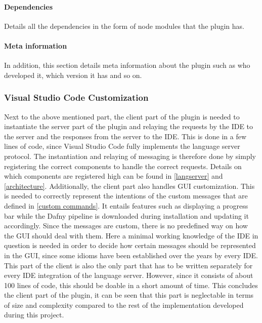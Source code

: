 \paragraph{Dependencies}
Details all the dependencies in the form of node modules that the plugin has.

\paragraph{Meta information}
In addition, this section details meta information about the plugin such as who developed it, which version it has and so on.

\subsubsection{Visual Studio Code Customization}
Next to the above mentioned part, the client part of the plugin is needed to instantiate the server part of the plugin and relaying the requests by the IDE to the server and the responses from the server to the IDE. This is done in a few lines of code, since Visual Studio Code fully implements the language server protocol. The instantiation and relaying of messaging is therefore done by simply registering the correct components to handle the correct requests. Details on which components are registered high can be found in \ref{langserver} and \ref{architecture}.\newline
Additionally, the client part also handles GUI customization. This is needed to correctly represent the intentions of the custom messages that are defined in \ref{custom commands}. It entails features such as displaying a progress bar while the Dafny pipeline is downloaded during installation and updating it accordingly. Since the messages are custom, there is no predefined way on how the GUI should deal with them. Here a minimal working knowledge of the IDE in question is needed in order to decide how certain messages should be represented in the GUI, since some idioms have been established over the years by every IDE. \newline
This part of the client is also the only part that has to be written separately for every IDE integration of the language server. However, since it consists of about 100 lines of code, this should be doable in a short amount of time. This concludes the client part of the plugin, it can be seen that this part is neglectable in terms of size and complexity compared to the rest of the implementation developed during this project. 

